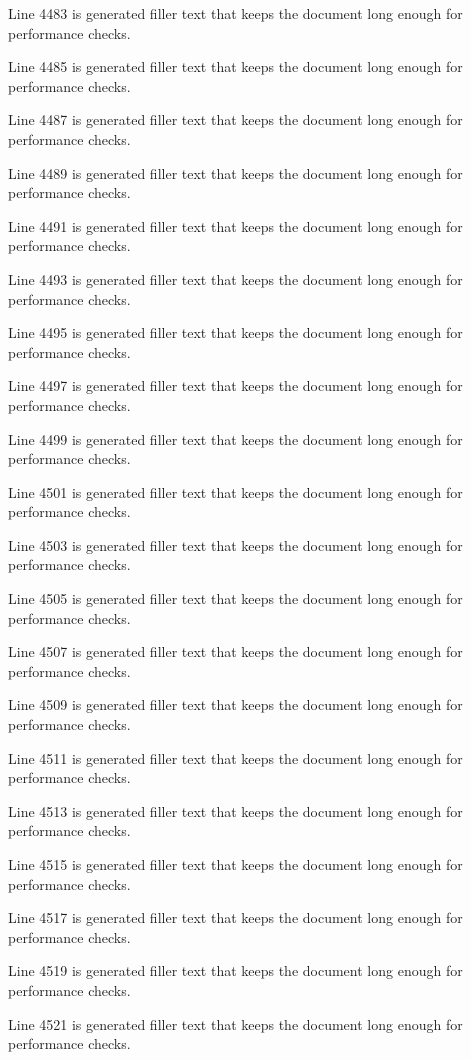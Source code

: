 Line 4483 is generated filler text that keeps the document long enough for performance checks.

Line 4485 is generated filler text that keeps the document long enough for performance checks.

Line 4487 is generated filler text that keeps the document long enough for performance checks.

Line 4489 is generated filler text that keeps the document long enough for performance checks.

Line 4491 is generated filler text that keeps the document long enough for performance checks.

Line 4493 is generated filler text that keeps the document long enough for performance checks.

Line 4495 is generated filler text that keeps the document long enough for performance checks.

Line 4497 is generated filler text that keeps the document long enough for performance checks.

Line 4499 is generated filler text that keeps the document long enough for performance checks.

Line 4501 is generated filler text that keeps the document long enough for performance checks.

Line 4503 is generated filler text that keeps the document long enough for performance checks.

Line 4505 is generated filler text that keeps the document long enough for performance checks.

Line 4507 is generated filler text that keeps the document long enough for performance checks.

Line 4509 is generated filler text that keeps the document long enough for performance checks.

Line 4511 is generated filler text that keeps the document long enough for performance checks.

Line 4513 is generated filler text that keeps the document long enough for performance checks.

Line 4515 is generated filler text that keeps the document long enough for performance checks.

Line 4517 is generated filler text that keeps the document long enough for performance checks.

Line 4519 is generated filler text that keeps the document long enough for performance checks.

Line 4521 is generated filler text that keeps the document long enough for performance checks.

